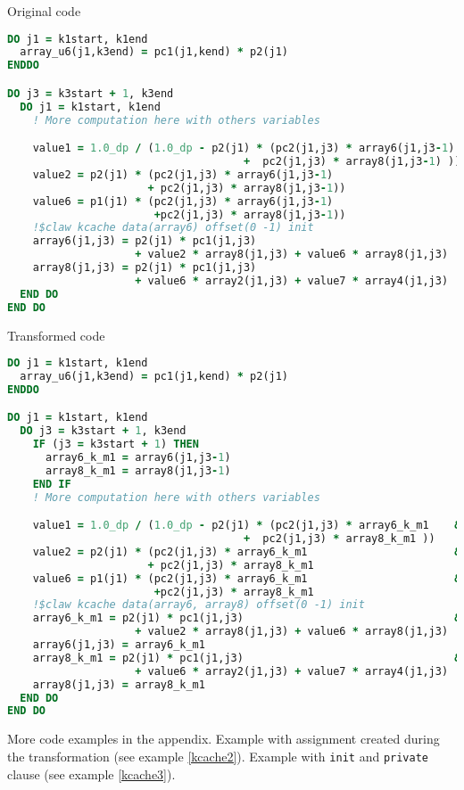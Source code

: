 Original code
\begin{lstlisting}[language=Fortran]
DO j1 = k1start, k1end
  array_u6(j1,k3end) = pc1(j1,kend) * p2(j1)
ENDDO

DO j3 = k3start + 1, k3end
  DO j1 = k1start, k1end
    ! More computation here with others variables

    value1 = 1.0_dp / (1.0_dp - p2(j1) * (pc2(j1,j3) * array6(j1,j3-1)  &
                                     +  pc2(j1,j3) * array8(j1,j3-1) ))
    value2 = p2(j1) * (pc2(j1,j3) * array6(j1,j3-1)                     &
                      + pc2(j1,j3) * array8(j1,j3-1))
    value6 = p1(j1) * (pc2(j1,j3) * array6(j1,j3-1)                     &
                       +pc2(j1,j3) * array8(j1,j3-1))
	!$claw kcache data(array6) offset(0 -1) init
    array6(j1,j3) = p2(j1) * pc1(j1,j3)                                 &
                    + value2 * array8(j1,j3) + value6 * array8(j1,j3)
    array8(j1,j3) = p2(j1) * pc1(j1,j3)                                 &
                    + value6 * array2(j1,j3) + value7 * array4(j1,j3)
  END DO
END DO
\end{lstlisting}


Transformed code
\begin{lstlisting}[language=Fortran]
DO j1 = k1start, k1end
  array_u6(j1,k3end) = pc1(j1,kend) * p2(j1)
ENDDO

DO j1 = k1start, k1end
  DO j3 = k3start + 1, k3end
    IF (j3 = k3start + 1) THEN
      array6_k_m1 = array6(j1,j3-1)
      array8_k_m1 = array8(j1,j3-1)
    END IF
    ! More computation here with others variables

    value1 = 1.0_dp / (1.0_dp - p2(j1) * (pc2(j1,j3) * array6_k_m1    &
                                     +  pc2(j1,j3) * array8_k_m1 ))
    value2 = p2(j1) * (pc2(j1,j3) * array6_k_m1                       &
                      + pc2(j1,j3) * array8_k_m1
    value6 = p1(j1) * (pc2(j1,j3) * array6_k_m1                       &
                       +pc2(j1,j3) * array8_k_m1
	!$claw kcache data(array6, array8) offset(0 -1) init
	array6_k_m1 = p2(j1) * pc1(j1,j3)                                 &
                    + value2 * array8(j1,j3) + value6 * array8(j1,j3)
    array6(j1,j3) = array6_k_m1
    array8_k_m1 = p2(j1) * pc1(j1,j3)                                 &
                    + value6 * array2(j1,j3) + value7 * array4(j1,j3)
    array8(j1,j3) = array8_k_m1
  END DO
END DO
\end{lstlisting}

More code examples in the appendix. Example with assignment created during the
transformation (see example \ref{kcache2}). Example with \lstinline!init! and
\lstinline!private! clause (see example \ref{kcache3}).


